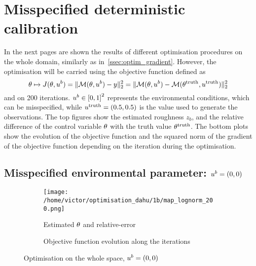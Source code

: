 \documentclass[../../Main_ManuscritThese.tex]{subfiles}
\begin{document}
\section{Misspecified deterministic calibration}
In the next pages are shown the results of different optimisation
procedures on the whole domain, similarly as
in~\cref{ssec:optim_gradient}. However, the optimisation will be
carried using the objective function defined as
\begin{equation}
  \theta \mapsto J(\theta, u^b) = \|\mathcal{M}(\theta, u^b) - y \|^2_2 = \|\mathcal{M}(\theta, u^b) - \mathcal{M}(\theta^{\mathrm{truth}},u^{\mathrm{truth}})\|_2^2
\end{equation}
and on \num{200} iterations. $\uu^b\in \interval{0}{1}^2$ represents
the environmental conditions, which can be misspecified, while
$u^{\mathrm{truth}}=(0.5, 0.5)$ is the value used to generate the
observations.  The top figures show the estimated roughness $z_b$, and
the relative difference of the control variable $\theta$ with the truth
value $\theta^{\mathrm{truth}}$. The bottom plots show the evolution of
the objective function and the squared norm of the gradient of the
objective function depending on the iteration during the optimisation.
\clearpage
\subsection*{Misspecified environmental parameter: $u^b=(0, 0)$}
\begin{figure}[ht]
  \begin{subfigure}{\textwidth}
  \centering
  \texttt{[image: /home/victor/optimisation\_dahu/1b/map\_lognorm\_200.png]}
  \caption{Estimated $\theta$ and relative-error}
\end{subfigure}
\begin{subfigure}{\textwidth}
  \centering
  \resizebox{1\textwidth}{!}{}
  \caption{Objective function evolution along the iterations}
\end{subfigure}
\caption{Optimisation on the whole space, $u^b=(0, 0)$}
\end{figure}
\clearpage
\end{document}
